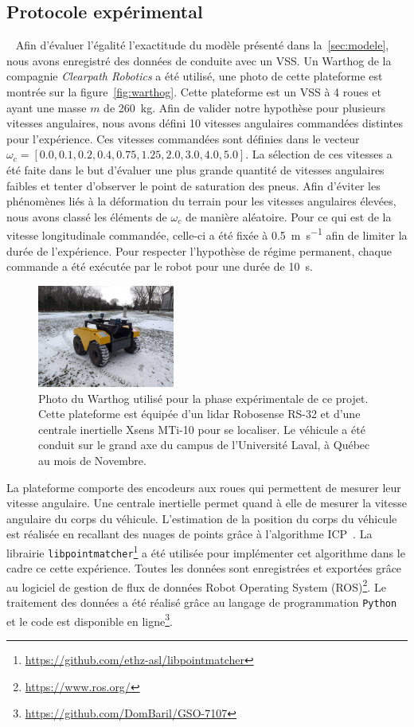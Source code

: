 \subsection{Protocole expérimental}~\label{sec:protocole}
Afin d'évaluer l'égalité l'exactitude du modèle présenté dans la~\autoref{sec:modele}, nous avons enregistré des données de conduite avec un \ac{VSS}. 
Un Warthog de la compagnie \textit{Clearpath Robotics} a été utilisé, une photo de cette plateforme est montrée sur la figure~\autoref{fig:warthog}.
Cette plateforme est un \ac{VSS} à 4 roues et ayant une masse $m$ de \SI{260}{\kg}.
Afin de valider notre hypothèse pour plusieurs vitesses angulaires, nous avons défini 10 vitesses angulaires commandées distintes pour l'expérience.
Ces vitesses commandées sont définies dans le vecteur $\omega_c = [0.0, 0.1, 0.2, 0.4, 0.75 ,1.25, 2.0, 3.0, 4.0, 5.0]$.
La sélection de ces vitesses a été faite dans le but d'évaluer une plus grande quantité de vitesses angulaires faibles et tenter d'observer le point de saturation des pneus.
Afin d'éviter les phénomènes liés à la déformation du terrain pour les vitesses angulaires élevées, nous avons classé les éléments de $\omega_c$ de manière aléatoire.
Pour ce qui est de la vitesse longitudinale commandée, celle-ci a été fixée à \SI{0.5}{\m\per\second} afin de limiter la durée de l'expérience.
Pour respecter l'hypothèse de régime permanent, chaque commande a été exécutée par le robot pour une durée de \SI{10}{\second}.

\begin{figure}[htpb]
	\centering
	\includegraphics[width=0.4\textwidth]{figs/warthog.pdf}
	\caption{Photo du Warthog utilisé pour la phase expérimentale de ce projet.
		Cette plateforme est équipée d'un lidar Robosense RS-32 et d'une centrale inertielle Xsens MTi-10 pour se localiser.
		Le véhicule a été conduit sur le grand axe du campus de l'Université Laval, à Québec au mois de Novembre.}
	\label{fig:warthog}
\end{figure}

La plateforme comporte des encodeurs aux roues qui permettent de mesurer leur vitesse angulaire.
Une centrale inertielle permet quand à elle de mesurer la vitesse angulaire du corps du véhicule.
L'estimation de la position du corps du véhicule est réalisée en recallant des nuages de points grâce à l'algorithme \ac{ICP}~\citep{Pomerleau2015}.
La librairie \texttt{libpointmatcher}\footnote{\url{https://github.com/ethz-asl/libpointmatcher}} a été utilisée pour implémenter cet algorithme dans le cadre ce cette expérience.
Toutes les données sont enregistrées et exportées grâce au logiciel de gestion de flux de données Robot Operating System (ROS)\footnote{\url{https://www.ros.org/}}.
Le traitement des données a été réalisé grâce au langage de programmation \texttt{Python} et le code est disponible en ligne\footnote{\url{https://github.com/DomBaril/GSO-7107}}.